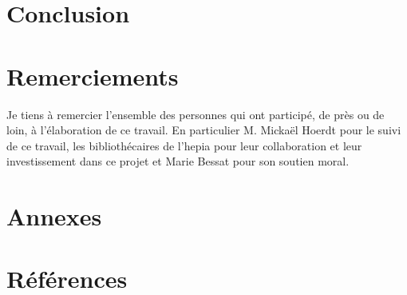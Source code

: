 \documentclass[a4paper, 12pt]{article}
\begin{document}
\section{Conclusion}

\section{Remerciements}
Je tiens à remercier l'ensemble des personnes qui ont participé, de près ou de loin, à l'élaboration de ce travail. En 
particulier M. Mickaël Hoerdt pour le suivi de ce travail, les bibliothécaires de l'hepia pour leur collaboration et 
leur investissement dans ce projet et Marie Bessat pour son soutien moral.

\section{Annexes}

\section{Références}


\end{document}
